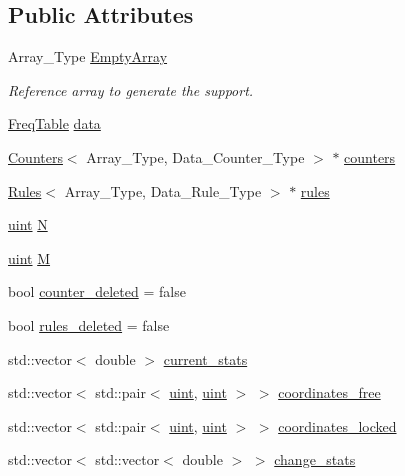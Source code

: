 \subsection*{Public Attributes}
\begin{DoxyCompactItemize}
\item 
Array\+\_\+\+Type \hyperlink{classbarry_1_1_support_a2eec6569a9206965a679782f7acf12e5}{Empty\+Array}
\begin{DoxyCompactList}\small\item\em Reference array to generate the support. \end{DoxyCompactList}\item 
\hyperlink{classbarry_1_1_freq_table}{Freq\+Table} \hyperlink{classbarry_1_1_support_ab58b9801dcbb924d68fd18db0821de99}{data}
\item 
\hyperlink{classbarry_1_1_counters}{Counters}$<$ Array\+\_\+\+Type, Data\+\_\+\+Counter\+\_\+\+Type $>$ $\ast$ \hyperlink{classbarry_1_1_support_a4f02bd235d4c7eccfe167edbc7ebe596}{counters}
\item 
\hyperlink{classbarry_1_1_rules}{Rules}$<$ Array\+\_\+\+Type, Data\+\_\+\+Rule\+\_\+\+Type $>$ $\ast$ \hyperlink{classbarry_1_1_support_a9311c3288f59feaece0680f9a7b630dd}{rules}
\item 
\hyperlink{namespacebarry_a11dfc53ddb4672278319aa04f1e09a6c}{uint} \hyperlink{classbarry_1_1_support_a776221deb92d113e5dee1cb100174ed4}{N}
\item 
\hyperlink{namespacebarry_a11dfc53ddb4672278319aa04f1e09a6c}{uint} \hyperlink{classbarry_1_1_support_abdf54592050a1c0db0fc7b079a7f9703}{M}
\item 
bool \hyperlink{classbarry_1_1_support_a5de08029a7262ba86df728c8b8427999}{counter\+\_\+deleted} = false
\item 
bool \hyperlink{classbarry_1_1_support_ab06f3a207f1d647d327a815bcedba9dd}{rules\+\_\+deleted} = false
\item 
std\+::vector$<$ double $>$ \hyperlink{classbarry_1_1_support_aa69d5a47e5ee039b19f42edacd5453d4}{current\+\_\+stats}
\item 
std\+::vector$<$ std\+::pair$<$ \hyperlink{namespacebarry_a11dfc53ddb4672278319aa04f1e09a6c}{uint}, \hyperlink{namespacebarry_a11dfc53ddb4672278319aa04f1e09a6c}{uint} $>$ $>$ \hyperlink{classbarry_1_1_support_aa235837435a5ed7ac540481676333b88}{coordinates\+\_\+free}
\item 
std\+::vector$<$ std\+::pair$<$ \hyperlink{namespacebarry_a11dfc53ddb4672278319aa04f1e09a6c}{uint}, \hyperlink{namespacebarry_a11dfc53ddb4672278319aa04f1e09a6c}{uint} $>$ $>$ \hyperlink{classbarry_1_1_support_a3abcd564b19c7399b596a5b63c72b149}{coordinates\+\_\+locked}
\item 
std\+::vector$<$ std\+::vector$<$ double $>$ $>$ \hyperlink{classbarry_1_1_support_a37c139514065d10807cd574ca748744b}{change\+\_\+stats}
\end{DoxyCompactItemize}


